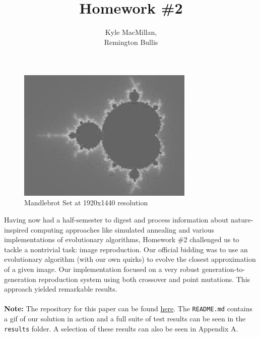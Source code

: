 \documentclass[12pt]{article}
\title{Homework \#2}
\author{Kyle MacMillan, \\Remington Bullis}
\begin{document}
\maketitle

\begin{figure}[H]
\centering
\noindent\includegraphics[width=0.75\textwidth]{../results/mandlebrot/mandlebrot_raw_4000}
\caption{Mandlebrot Set at 1920x1440 resolution}
\label{fig:mandlebrot_raw}
\end{figure}

Having now had a half-semester to digest and process information about nature-inspired computing approaches like simulated annealing and various implementations of evolutionary algorithms, Homework \#2 challenged us to tackle a nontrivial task: image reproduction. Our official bidding was to use an evolutionary algorithm (with our own quirks)  to evolve the closest approximation of a given image. Our implementation focused on a very robust generation-to-generation reproduction system using both crossover and point mutations. This approach yielded remarkable results. 
\\ \\
\textbf{Note: }The repository for this paper can be found \href{https://github.com/macattackftw/ncGA}{here}. 
The \verb|README.md| contains a gif of our solution in action and a full suite of test results can be seen in the \verb|results| folder. A selection of these results can also be seen in Appendix A. 


\end{document}
